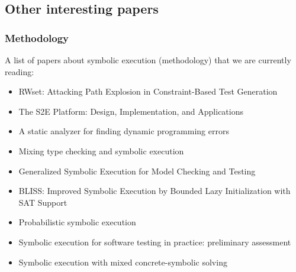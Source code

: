 \subsection{Other interesting papers}

\subsubsection{Methodology}
A list of papers about symbolic execution (methodology) that we are currently reading:
\begin{itemize}
  \item \cite{BCE-TACAS08} RWset: Attacking Path Explosion in Constraint-Based Test Generation
  \item \cite{CKC-TOCS12} The S2E Platform: Design, Implementation, and Applications
  \item \cite{BPS-SPE00} A static analyzer for finding dynamic programming errors
  \item \cite{KCF-PLDI10} Mixing type checking and symbolic execution
  \item \cite{KPV-TACAS03} Generalized Symbolic Execution for Model Checking and Testing
  \item \cite{BLISS-TSE15} BLISS: Improved Symbolic Execution by Bounded Lazy Initialization with SAT Support
  \item \cite{GDV-ISSTA12} Probabilistic symbolic execution
  \item \cite{CGK-ICSE11} Symbolic execution for software testing in practice: preliminary assessment
  \item \cite{PRV-ISSTA11} Symbolic execution with mixed concrete-symbolic solving
\end{itemize}

